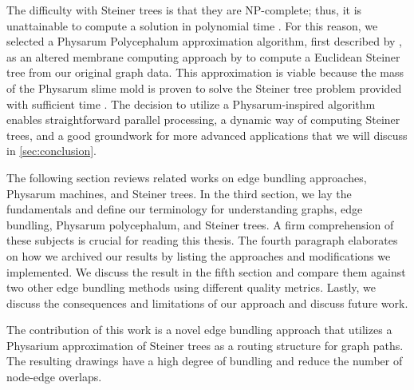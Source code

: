 The difficulty with Steiner trees is that they are NP-complete; thus, it is unattainable to compute a solution in polynomial time \cite{ljubic_solving_2021}. For this reason, we selected a Physarum Polycephalum approximation algorithm, first described by \cite{tero_physarum_2006}, as an altered membrane computing approach by \cite{liu_physarum_2015} to compute a Euclidean Steiner tree from our original graph data. This approximation is viable because the mass of the Physarum slime mold is proven to solve the Steiner tree problem provided with sufficient time \cite{zhang_improved_2014}. The decision to utilize a Physarum-inspired algorithm enables straightforward parallel processing, a dynamic way of computing Steiner trees, and a good groundwork for more advanced applications that we will discuss in \autoref{sec:conclusion}.

The following section reviews related works on edge bundling approaches, Physarum machines, and Steiner trees. 
In the third section, we lay the fundamentals and define our terminology for understanding graphs, edge bundling, Physarum polycephalum, and Steiner trees. A firm comprehension of these subjects is crucial for reading this thesis. The fourth paragraph elaborates on how we archived our results by listing the approaches and modifications we implemented. We discuss the result in the fifth section and compare them against two other edge bundling methods using different quality metrics. Lastly, we discuss the consequences and limitations of our approach and discuss future work.

The contribution of this work is a novel edge bundling approach that utilizes a Physarium approximation of Steiner trees as a routing structure for graph paths. The resulting drawings have a high degree of bundling and reduce the number of node-edge overlaps.